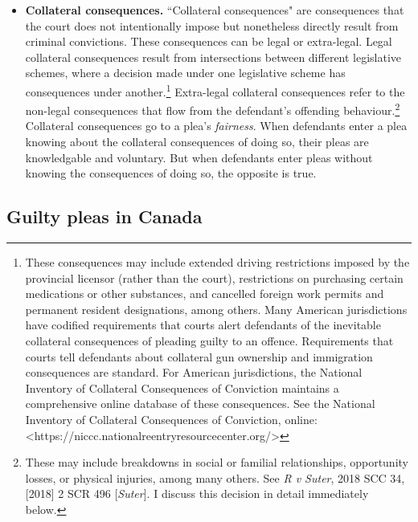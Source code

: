 \begin{itemize}
\item \textbf{Collateral consequences.} ``Collateral consequences" are consequences that the court does not intentionally impose but nonetheless directly result from criminal convictions. These consequences can be legal or extra-legal. Legal collateral consequences result from intersections between different legislative schemes, where a decision made under one legislative scheme has consequences under another.\footnote{These consequences may include extended driving restrictions imposed by the provincial licensor (rather than the court), restrictions on purchasing certain medications or other substances, and cancelled foreign work permits and permanent resident designations, among others. Many American jurisdictions have codified requirements that courts alert defendants of the inevitable collateral consequences of pleading guilty to an offence. Requirements that courts tell defendants about collateral gun ownership and immigration consequences are standard. For American jurisdictions, the National Inventory of Collateral Consequences of Conviction maintains a comprehensive online database of these consequences. See the National Inventory of Collateral Consequences of Conviction, online: \textless https://niccc.nationalreentryresourcecenter.org/\textgreater} Extra-legal collateral consequences refer to the non-legal consequences that flow from the defendant's offending behaviour.\footnote{These may include breakdowns in social or familial relationships, opportunity losses, or physical injuries, among many others. See \textit{R v Suter}, 2018 SCC 34, [2018] 2 SCR 496 [\textit{Suter}]. I discuss this decision in detail immediately below.} Collateral consequences go to a plea's \textit{fairness}. When defendants enter a plea knowing about the collateral consequences of doing so, their pleas are knowledgable and voluntary. But when defendants enter pleas without knowing the consequences of doing so, the opposite is true.
\end{itemize}

\subsection{Guilty pleas in Canada}

